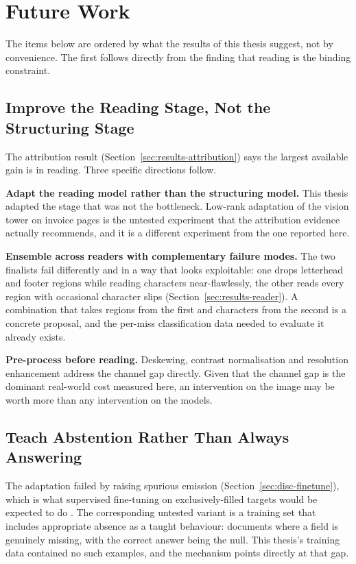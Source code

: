 \section{Future Work}
\label{sec:future-work}

The items below are ordered by what the results of this thesis suggest, not by convenience.
The first follows directly from the finding that reading is the binding constraint.

\subsection{Improve the Reading Stage, Not the Structuring Stage}
\label{sec:fw-reader}

The attribution result (Section~\ref{sec:results-attribution}) says the largest available gain is in
reading. Three specific directions follow.

\textbf{Adapt the reading model rather than the structuring model.} This thesis adapted the stage
that was not the bottleneck. Low-rank adaptation of the vision tower on invoice pages is the
untested experiment that the attribution evidence actually recommends, and it is a different
experiment from the one reported here.

\textbf{Ensemble across readers with complementary failure modes.} The two finalists fail
differently and in a way that looks exploitable: one drops letterhead and footer regions while
reading characters near-flawlessly, the other reads every region with occasional character slips
(Section~\ref{sec:results-reader}). A combination that takes regions from the first and characters from
the second is a concrete proposal, and the per-miss classification data needed to evaluate it
already exists.

\textbf{Pre-process before reading.} Deskewing, contrast normalisation and resolution
enhancement address the channel gap directly. Given that the channel gap is the dominant
real-world cost measured here, an intervention on the image may be worth more than any
intervention on the models.

\subsection{Teach Abstention Rather Than Always Answering}
\label{sec:fw-abstention}

The adaptation failed by raising spurious emission (Section~\ref{sec:disc-finetune}), which is what
supervised fine-tuning on exclusively-filled targets would be expected to do
\parencite{uluoglakci2026humility}. The corresponding untested variant is a training set that includes
appropriate absence as a taught behaviour: documents where a field is genuinely missing, with the
correct answer being the null. This thesis's training data contained no such examples, and the
mechanism points directly at that gap.

